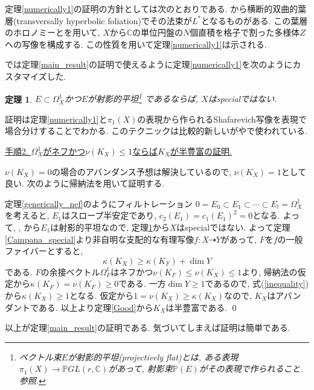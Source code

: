 \documentclass[12pt]{amsart}
\newtheorem{thm}{定理}[section]
\theoremstyle{definition}
\theoremstyle{remark}
\newcommand{\C}{\mathbb{C}}
\begin{document}
定理\ref{numerically1}の証明の方針としては次のとおりである. \cite{Tou16}から横断的双曲的葉層(transversally hyperbolic foliation)でその法束が$L^{*}$となるものがある. この葉層のホロノミーと\cite{CS}を用いて, $X$から$\C$の単位円盤の$N$個直積を格子で割った多様体$Z$への写像を構成する. この性質を用いて定理\ref{numerically1}は示される.

\cite{IM22}では定理\ref{main_result}の証明で使えるように定理\ref{numerically1}を次のようにカスタマイズした.
\begin{thm}\cite{IM22}
\label{nonspecial}
$E \subset \Omega_{X}^{1}$かつ$E$が射影的平坦\footnote{ベクトル束$E$が射影的平坦(projectively flat)とは, ある表現$\pi_1(X) \rightarrow \mathbb{P}GL(r,\C)$があって, 射影束$\mathbb{P}(E)$がその表現で作られること. \cite[Corollary 2.7]{Kob87}参照.}
であるならば, $X$はspecialではない.
\end{thm}
証明は定理\ref{numerically1}と$\pi_1(X)$の表現から作られるShafarevich写像を表現で場合分けすることでわかる. このテクニックは比較的新しいが\cite{JR13}や\cite{GKP20b}で使われている.

\vspace{11pt}
\hspace{-11pt}\underline{手順2. $\Omega_{X}^{1}$がネフかつ$\nu(K_X) \le 1$ならば$K_X$が半豊富の証明.}

$\nu(K_X)=0$の場合のアバンダンス予想は解決しているので, $\nu(K_X)=1$として良い. 
次のように帰納法を用いて証明する.

定理\ref{generically_nef}のようにフィルトレーション $0 =E_0 \subset E_1 \subset \cdots \subset E_l = \Omega_{X}^{1}$を考えると, $E_1$はスロープ半安定であり, $c_2(E_1)=c_1(E_1)^{2}=0$となる. 
よって\cite{Nak04}, \cite{Wu20}, \cite{LOY20}から$E_1$は射影的平坦なので, 定理\ref{nonspecial}から$X$はspecialではない. よって定理\ref{Campana_special}より非自明な支配的な有理写像$f : X \dashrightarrow Y$があって, $F$を$f$の一般ファイバーとすると, 
\begin{equation}
\label{inequality}
\kappa(K_X) \ge \kappa(K_F) + \dim Y
\end{equation}
である. $F$の余接ベクトル$\Omega_{F}^{1}$はネフかつ$\nu(K_F) \le \nu(K_X) \le1$より, 帰納法の仮定から$\kappa(K_F) = \nu (K_F) \ge 0$である. 一方$\dim Y \ge 1$であるので, 式(\ref{inequality})から$\kappa(K_X) \ge 1$となる. 仮定から$1 = \nu (K_X) \ge \kappa(K_X)$なので, $K_X$はアバンダントである. 以上より定理\ref{Good}から$K_X$は半豊富である. \qed

\vspace{11pt}
以上が定理\ref{main_result}の証明である. 気づいてしまえば証明は簡単である.
\end{document}
